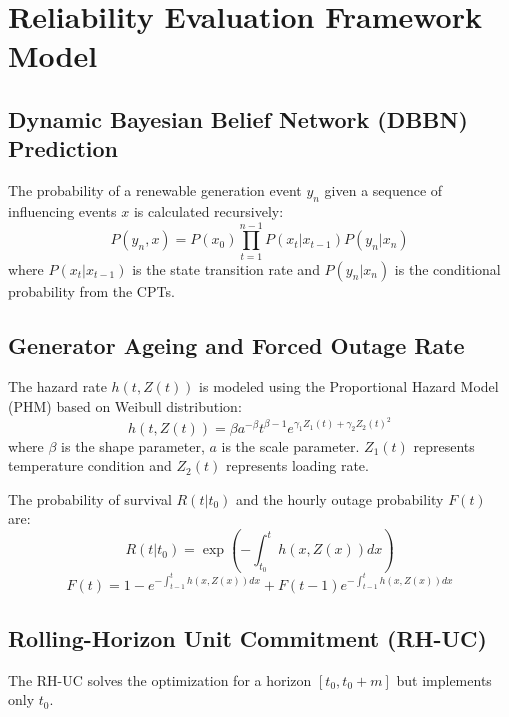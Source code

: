 \documentclass{article}
\begin{document}
\section{Reliability Evaluation Framework Model}

\subsection{Dynamic Bayesian Belief Network (DBBN) Prediction}
The probability of a renewable generation event $y_n$ given a sequence of influencing events $x$ is calculated recursively:
\begin{equation}
P(y_n, x) = P(x_0) \prod_{t=1}^{n-1} P(x_t | x_{t-1}) P(y_n | x_n)
\end{equation}
where $P(x_t | x_{t-1})$ is the state transition rate and $P(y_n | x_n)$ is the conditional probability from the CPTs.

\subsection{Generator Ageing and Forced Outage Rate}
The hazard rate $h(t, Z(t))$ is modeled using the Proportional Hazard Model (PHM) based on Weibull distribution:
\begin{equation}
h(t, Z(t)) = \beta a^{-\beta} t^{\beta-1} e^{\gamma_1 Z_1(t) + \gamma_2 Z_2(t)^2}
\end{equation}
where $\beta$ is the shape parameter, $a$ is the scale parameter. $Z_1(t)$ represents temperature condition and $Z_2(t)$ represents loading rate.

The probability of survival $R(t|t_0)$ and the hourly outage probability $F(t)$ are:
\begin{equation}
R(t | t_0) = \exp\left(-\int_{t_0}^{t} h(x, Z(x)) dx\right)
\end{equation}
\begin{equation}
F(t) = 1 - e^{-\int_{t-1}^{t} h(x, Z(x)) dx} + F(t-1)e^{-\int_{t-1}^{t} h(x, Z(x)) dx}
\end{equation}

\subsection{Rolling-Horizon Unit Commitment (RH-UC)}
The RH-UC solves the optimization for a horizon $[t_0, t_0+m]$ but implements only $t_0$.
\end{document}

